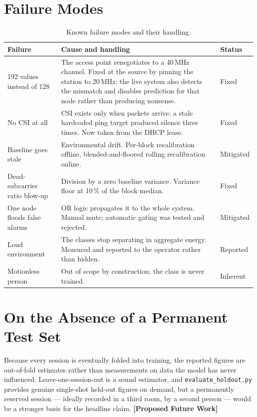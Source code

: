 \documentclass[11pt,a4paper,oneside]{report}
\newcommand{\evidencetag}[2]{{\small\sffamily\bfseries\textcolor{#1}{[#2]}}}
\newcommand{\Fut}{\evidencetag{bad}{Proposed Future Work}}
\newcommand{\code}[1]{\texttt{\small #1}}
\begin{document}
\section{Failure Modes}
\begin{table}[H]
\centering
\caption{Known failure modes and their handling.}
\label{tab:failures}
\renewcommand{\arraystretch}{1.25}
\begin{tabularx}{\linewidth}{|l|X|l|}
\hline
\textbf{Failure} & \textbf{Cause and handling} & \textbf{Status} \\
\hline
192 values instead of 128 &
The access point renegotiates to a 40\,MHz channel. Fixed at the source by
pinning the station to 20\,MHz; the live system also detects the mismatch and
disables prediction for that node rather than producing nonsense. &
Fixed \\
\hline
No CSI at all &
CSI exists only when packets arrive; a stale hardcoded ping target produced
silence three times. Now taken from the DHCP lease. &
Fixed \\
\hline
Baseline goes stale &
Environmental drift. Per-block recalibration offline, blended-and-floored
rolling recalibration online. &
Mitigated \\
\hline
Dead-subcarrier ratio blow-up &
Division by a zero baseline variance. Variance floor at 10\,\% of the block
median. &
Fixed \\
\hline
One node floods false alarms &
OR logic propagates it to the whole system. Manual mute; automatic gating was
tested and rejected. &
Mitigated \\
\hline
Loud environment &
The classes stop separating in aggregate energy. Measured and reported to the
operator rather than hidden. &
Reported \\
\hline
Motionless person &
Out of scope by construction; the class is never trained. &
Inherent \\
\hline
\end{tabularx}
\end{table}

\section{On the Absence of a Permanent Test Set}

Because every session is eventually folded into training, the reported figures
are out-of-fold estimates rather than measurements on data the model has never
influenced. Leave-one-session-out is a sound estimator, and
\code{evaluate\_holdout.py} provides genuine single-shot held-out figures on
demand, but a permanently reserved session --- ideally recorded in a third
room, by a second person --- would be a stronger basis for the headline claim.
\Fut
\end{document}
